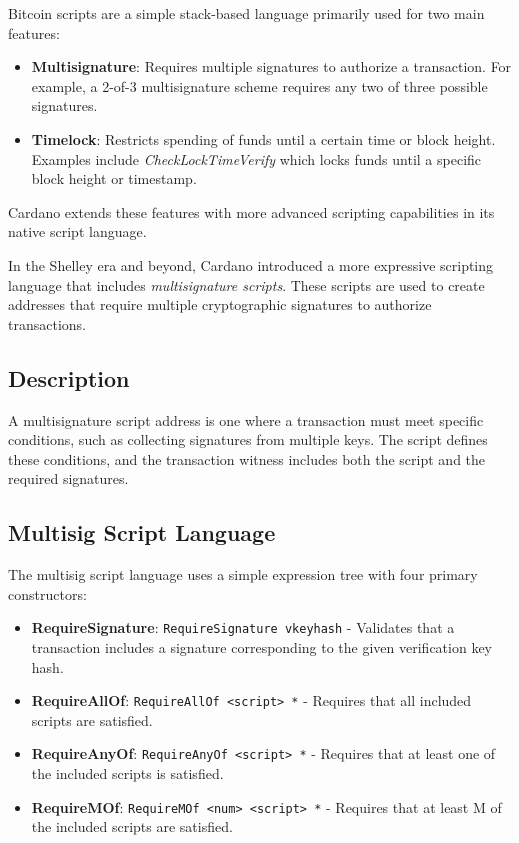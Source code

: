 Bitcoin scripts are a simple stack-based language primarily used for two main features:
\begin{itemize}
    \item \textbf{Multisignature}: Requires multiple signatures to authorize a transaction. For example, a 2-of-3 multisignature scheme requires any two of three possible signatures.
    \item \textbf{Timelock}: Restricts spending of funds until a certain time or block height. Examples include \textit{CheckLockTimeVerify} which locks funds until a specific block height or timestamp.
\end{itemize}

Cardano extends these features with more advanced scripting capabilities in its native script language.


In the Shelley era and beyond, Cardano introduced a more expressive scripting language that includes \textit{multisignature scripts}. These scripts are used to create addresses that require multiple cryptographic signatures to authorize transactions. 

\subsection{Description}

A multisignature script address is one where a transaction must meet specific conditions, such as collecting signatures from multiple keys. The script defines these conditions, and the transaction witness includes both the script and the required signatures.

\subsection{Multisig Script Language}

The multisig script language uses a simple expression tree with four primary constructors:

\begin{itemize}
    \item \textbf{RequireSignature}: \texttt{RequireSignature vkeyhash} - Validates that a transaction includes a signature corresponding to the given verification key hash.
    \item \textbf{RequireAllOf}: \texttt{RequireAllOf <script> *} - Requires that all included scripts are satisfied.
    \item \textbf{RequireAnyOf}: \texttt{RequireAnyOf <script> *} - Requires that at least one of the included scripts is satisfied.
    \item \textbf{RequireMOf}: \texttt{RequireMOf <num> <script> *} - Requires that at least M of the included scripts are satisfied.
\end{itemize}

